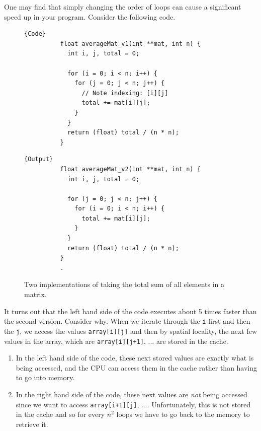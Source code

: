 \documentclass{article}
\begin{document}
    \begin{example}
      One may find that simply changing the order of loops can cause a significant speed up in your program. Consider the following code. 
      \begin{figure}[H]
        \centering 
        \noindent\begin{minipage}{.5\textwidth}
        \begin{lstlisting}[]{Code}
          float averageMat_v1(int **mat, int n) {
            int i, j, total = 0;

            for (i = 0; i < n; i++) {
              for (j = 0; j < n; j++) {
                // Note indexing: [i][j]
                total += mat[i][j];
              }
            }
            return (float) total / (n * n);
          }
        \end{lstlisting}
        \end{minipage}
        \hfill
        \begin{minipage}{.49\textwidth}
        \begin{lstlisting}[]{Output}
          float averageMat_v2(int **mat, int n) {
            int i, j, total = 0;

            for (j = 0; j < n; j++) {
              for (i = 0; i < n; i++) {
                total += mat[i][j];
              }
            }
            return (float) total / (n * n);
          }
          .
        \end{lstlisting}
        \end{minipage}
        \caption{Two implementations of taking the total sum of all elements in a matrix.} 
        \label{fig:matrix_sum}
      \end{figure}
      It turns out that the left hand side of the code executes about 5 times faster than the second version. Consider why. When we iterate through the \texttt{i} first and then the \texttt{j}, we access the values \texttt{array[i][j]} and then by spatial locality, the next few values in the array, which are \texttt{array[i][j+1]}, ... are stored in the cache. 
      \begin{enumerate}
        \item In the left hand side of the code, these next stored values are exactly what is being accessed, and the CPU can access them in the cache rather than having to go into memory. 
        \item In the right hand side of the code, these next values are \textit{not} being accessed since we want to access \texttt{array[i+1][j]}, .... Unfortunately, this is not stored in the cache and so for every $n^2$ loops we have to go back to the memory to retrieve it. 
      \end{enumerate}
    \end{example}
\end{document}
